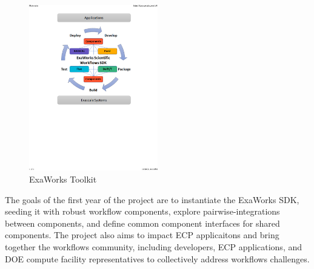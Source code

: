 \begin{figure}
\begin{center}
    \includegraphics[width=0.5\textwidth]{projects/2.3.5-Ecosystem/2.3.5.10-ExaWorks/ExaWorks_Circle.pdf}
  \end{center}
  \caption{ExaWorks Toolkit\label{fig:arch}}
\end{figure} 

The goals of the first year of the project are to instantiate the ExaWorks SDK, seeding it with
robust workflow components, explore pairwise-integrations between components, and define
common component interfaces for shared components.  The project also aims to impact ECP applicaitons and 
bring together the workflows community, including developers, ECP applications, and DOE compute facility representatives
to collectively address workflows challenges.

